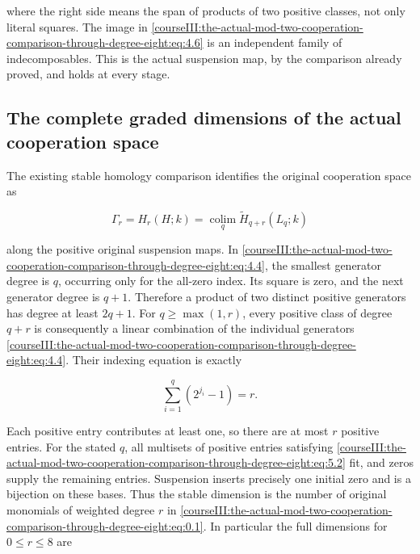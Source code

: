 where the right side means the span of products of two positive classes, not only literal squares. The image in \eqref{courseIII:the-actual-mod-two-cooperation-comparison-through-degree-eight:eq:4.6} is an independent family of indecomposables. This is the actual suspension map, by the comparison already proved, and holds at every stage.

\subsection{The complete graded dimensions of the actual cooperation space}
\label{courseIII:the-actual-mod-two-cooperation-comparison-through-degree-eight:actual-eight-graded-dimensions}

\label{courseIII:the-actual-mod-two-cooperation-comparison-through-degree-eight:section-5}\label{courseIII:actual-degree8:5}

The existing stable homology comparison identifies the original cooperation space as

\begin{equation}
\Gamma_r=H_r(H;k)=\operatorname*{colim}_{q}\widetilde H_{q+r}(L_q;k)
\label{courseIII:the-actual-mod-two-cooperation-comparison-through-degree-eight:eq:5.1}
\end{equation}

along the positive original suspension maps. In \eqref{courseIII:the-actual-mod-two-cooperation-comparison-through-degree-eight:eq:4.4}, the smallest generator degree is \(q\), occurring only for the all-zero index. Its square is zero, and the next generator degree is \(q+1\). Therefore a product of two distinct positive generators has degree at least \(2q+1\). For \(q\geq\max(1,r)\), every positive class of degree \(q+r\) is consequently a linear combination of the individual generators \eqref{courseIII:the-actual-mod-two-cooperation-comparison-through-degree-eight:eq:4.4}. Their indexing equation is exactly

\begin{equation}
\sum_{i=1}^q(2^{j_i}-1)=r.
\label{courseIII:the-actual-mod-two-cooperation-comparison-through-degree-eight:eq:5.2}
\end{equation}

Each positive entry contributes at least one, so there are at most \(r\) positive entries. For the stated \(q\), all multisets of positive entries satisfying \eqref{courseIII:the-actual-mod-two-cooperation-comparison-through-degree-eight:eq:5.2} fit, and zeros supply the remaining entries. Suspension inserts precisely one initial zero and is a bijection on these bases. Thus the stable dimension is the number of original monomials of weighted degree \(r\) in \eqref{courseIII:the-actual-mod-two-cooperation-comparison-through-degree-eight:eq:0.1}. In particular the full dimensions for \(0\leq r\leq8\) are

